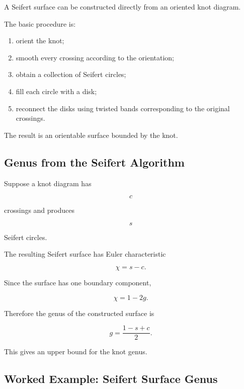 A Seifert surface can be constructed directly from an oriented knot diagram.

The basic procedure is:

\begin{enumerate}
    \item orient the knot;
    \item smooth every crossing according to the orientation;
    \item obtain a collection of Seifert circles;
    \item fill each circle with a disk;
    \item reconnect the disks using twisted bands corresponding to the
    original crossings.
\end{enumerate}

The result is an orientable surface bounded by the knot.

\subsection{Genus from the Seifert Algorithm}
\label{subsec:genus-seifert-algorithm}

Suppose a knot diagram has

\[
c
\]

crossings and produces

\[
s
\]

Seifert circles.

The resulting Seifert surface has Euler characteristic

\[
\boxed{
\chi=s-c.
}
\]

Since the surface has one boundary component,

\[
\chi=1-2g.
\]

Therefore the genus of the constructed surface is

\[
\boxed{
g
=
\frac{1-s+c}{2}.
}
\]

This gives an upper bound for the knot genus.

\subsection{Worked Example: Seifert Surface Genus}
\label{subsec:worked-seifert-genus}

